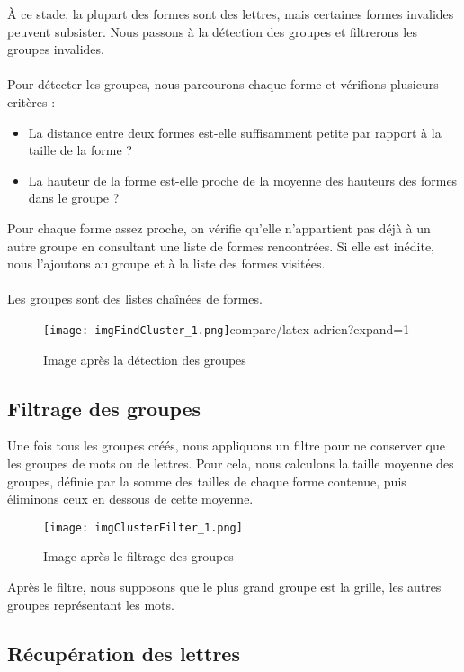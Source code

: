 \documentclass{article}
\begin{document}
À ce stade, la plupart des formes sont des lettres, mais certaines formes invalides peuvent subsister. Nous passons à la détection des groupes et filtrerons les groupes invalides.
\\\\
Pour détecter les groupes, nous parcourons chaque forme et vérifions plusieurs critères :
\begin{itemize}
    \item La distance entre deux formes est-elle suffisamment petite par rapport à la taille de la forme ?
    \item La hauteur de la forme est-elle proche de la moyenne des hauteurs des formes dans le groupe ?
\end{itemize}
\vspace{0.5cm}
Pour chaque forme assez proche, on vérifie qu'elle n'appartient pas déjà à un autre groupe en consultant une liste de formes rencontrées. Si elle est inédite, nous l’ajoutons au groupe et à la liste des formes visitées.
\\\\
Les groupes sont des listes chaînées de formes.

\begin{figure}[H]
    \centering
    \texttt{[image: imgFindCluster\_1.png]}compare/latex-adrien?expand=1
    \caption{Image après la détection des groupes}
\end{figure}

\subsection{Filtrage des groupes}

Une fois tous les groupes créés, nous appliquons un filtre pour ne conserver que les groupes de mots ou de lettres. Pour cela, nous calculons la taille moyenne des groupes, définie par la somme des tailles de chaque forme contenue, puis éliminons ceux en dessous de cette moyenne.

\begin{figure}[H]
    \centering
    \texttt{[image: imgClusterFilter\_1.png]}
    \caption{Image après le filtrage des groupes}
\end{figure}

Après le filtre, nous supposons que le plus grand groupe est la grille, les autres groupes représentant les mots.

\subsection{Récupération des lettres}
\end{document}
